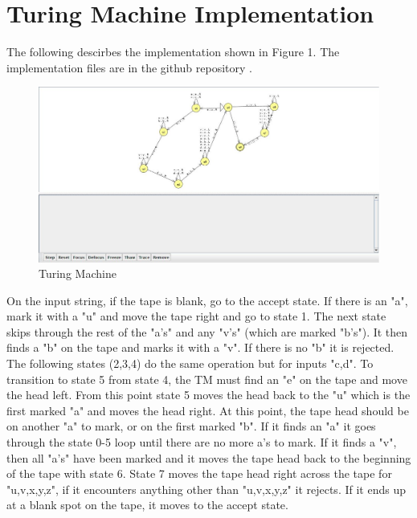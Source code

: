 \documentclass{article}
\begin{document}
\section{Turing Machine Implementation}
The following descirbes the implementation shown in Figure 1. The implementation files are in the github repository \cite{git}.\\
\begin{figure}[H]
  \includegraphics[width=\linewidth]{TuringMachine.jpg}
  \caption{Turing Machine}
  \label{fig:TM1}
\end{figure}
On the input string, if the tape is blank, go to the accept state. If there is an "a", mark it with a "u" and move the tape right and go to state 1. The next state skips through the rest of the "a's" and any "v's" (which are marked "b's"). It then finds a "b" on the tape and marks it with a "v". If there is no "b" it is rejected. The following states (2,3,4) do the same operation but for inputs "c,d". To transition to state 5 from state 4, the TM must find an "e" on the tape and move the head left. From this point state 5 moves the head back to the "u" which is the first marked "a" and moves the head right. At this point, the tape head should be on another "a" to mark, or on the first marked "b". If it finds an "a" it goes through the state 0-5 loop until there are no more a's to mark. If it finds a "v", then all "a's" have been marked and it moves the tape head back to the beginning of the tape with state 6. State 7 moves the tape head right across the tape for "u,v,x,y,z", if it encounters anything other than "u,v,x,y,z" it rejects. If it ends up at a blank spot on the tape, it moves to the accept state.\\
\end{document}
